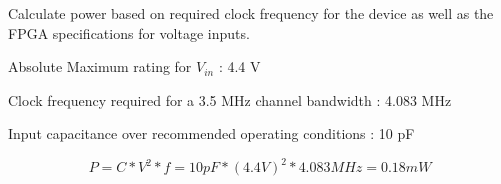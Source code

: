 \documentclass[dvips,10pt,twocolumn]{article}
\begin{document}
  Calculate power based on required clock frequency for the device as well as the
  FPGA specifications for voltage inputs.
  
  Absolute Maximum rating for $V_{in}$ : 4.4 V
  
  Clock frequency required for a 3.5 MHz channel bandwidth : 4.083 MHz
  
  Input capacitance over recommended operating conditions : 10 pF
  \begin{center}\begin{equation}
  P = C * V^2 * f = 10 pF * (4.4 V)^2 * 4.083 MHz = 0.18 mW
  \end{equation}\end{center}
  

{}

\end{document}
